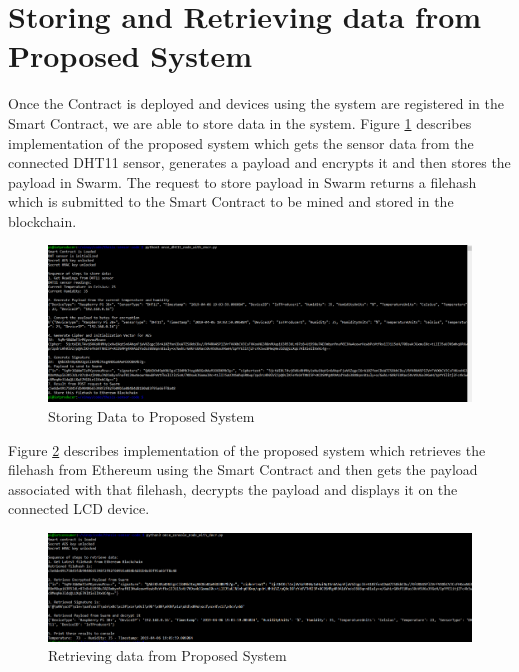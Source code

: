 \documentclass[11pt,openright]{report}
\begin{document}
\section{Storing and Retrieving data from Proposed System}
Once the Contract is deployed and devices using the system are registered in the Smart Contract, we are able to store data in the system.
\newline
\newline
Figure \ref{fig:store_prop_system_res} describes implementation of the proposed system which gets the sensor data from the connected DHT11 sensor, generates a payload and encrypts it and then stores the payload in Swarm. The request to store payload in Swarm returns a filehash which is submitted to the Smart Contract to be mined and stored in the blockchain.
\newline
\newline
\begin{figure}[!htbp]
    \centering
    \includegraphics[scale=0.4]{results/IoTProd.png}
    \caption{Storing Data to Proposed System}
    \label{fig:store_prop_system_res}
\end{figure}
\newline
\newline
Figure \ref{fig:retrieve_prop_system_res} describes implementation of the proposed system which retrieves the filehash from Ethereum using the Smart Contract and then gets the payload associated with that filehash, decrypts the payload and displays it on the connected LCD device.
\newline
\newline
\begin{figure}[!htbp]
    \centering
    \includegraphics[scale=0.4]{results/IoTConsole.png}
    \caption{Retrieving data from Proposed System}
    \label{fig:retrieve_prop_system_res}
\end{figure}
\newline
\newline
\end{document}
